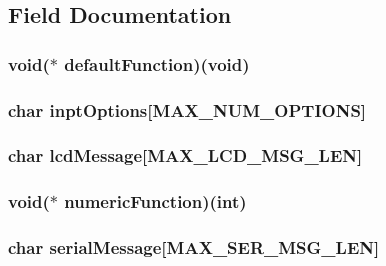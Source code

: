 \subsection{Field Documentation}
\hypertarget{structSubMenu_ad86a4714605654261200ef4194e1657c}{
\subsubsection[{default\+Function}]{\setlength{\rightskip}{0pt plus 5cm}void($\ast$ default\+Function)(void)}}\label{structSubMenu_ad86a4714605654261200ef4194e1657c}
\hypertarget{structSubMenu_aef0980fb751ef312c4ff945539aa3cd4}{
\subsubsection[{inpt\+Options}]{\setlength{\rightskip}{0pt plus 5cm}char inpt\+Options\mbox{[}{\bf M\+A\+X\+\_\+\+N\+U\+M\+\_\+\+O\+P\+T\+I\+O\+N\+S}\mbox{]}}}\label{structSubMenu_aef0980fb751ef312c4ff945539aa3cd4}
\hypertarget{structSubMenu_a10ce8be3d2bbadbc9c262b6be4bb3aec}{
\subsubsection[{lcd\+Message}]{\setlength{\rightskip}{0pt plus 5cm}char lcd\+Message\mbox{[}{\bf M\+A\+X\+\_\+\+L\+C\+D\+\_\+\+M\+S\+G\+\_\+\+L\+E\+N}\mbox{]}}}\label{structSubMenu_a10ce8be3d2bbadbc9c262b6be4bb3aec}
\hypertarget{structSubMenu_a1dae2f8dad8e2d2a30b13ee69ea542db}{
\subsubsection[{numeric\+Function}]{\setlength{\rightskip}{0pt plus 5cm}void($\ast$ numeric\+Function)(int)}}\label{structSubMenu_a1dae2f8dad8e2d2a30b13ee69ea542db}
\hypertarget{structSubMenu_a24706f7b55951b0e21967a256e107936}{
\subsubsection[{serial\+Message}]{\setlength{\rightskip}{0pt plus 5cm}char serial\+Message\mbox{[}{\bf M\+A\+X\+\_\+\+S\+E\+R\+\_\+\+M\+S\+G\+\_\+\+L\+E\+N}\mbox{]}}}\label{structSubMenu_a24706f7b55951b0e21967a256e107936}
